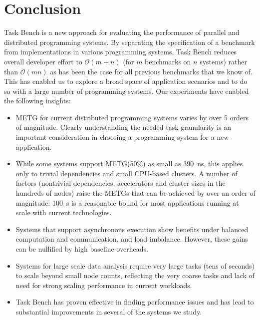 \section{Conclusion}
\label{sec:conclusion}

Task Bench is a new approach for evaluating the performance of
parallel and distributed programming systems. By separating the
specification of a benchmark from implementations in various
programming systems, Task Bench reduces overall developer effort to
$\mathcal{O}(m + n)$ (for $m$ benchmarks on $n$ systems) rather than
$\mathcal{O}(mn)$ as has been the case for all previous
benchmarks that we know of. This has enabled us to explore a broad space of
application scenarios and to do so with a large number of programming
systems. Our experiments have enabled the following
insights:

\begin{itemize}[leftmargin=*]

\item METG for current distributed programming systems varies by over
  5 orders of magnitude.  Clearly understanding the needed task
  granularity is an important consideration in choosing a programming
  system for a new application.

\item While some systems support METG(50\%) as small as 390~ns, this applies only to trivial dependencies and small CPU-based clusters. A number of factors (nontrivial dependencies, accelerators and cluster sizes in the hundreds of nodes) raise
  the METGs that can be achieved by over an order of magnitude: 100~\textmu{}s is a reasonable bound for most applications running at scale with current technologies.

\item Systems that support asynchronous execution show benefits under
  balanced computation
  and communication, and load imbalance. However, these gains can be nullified by
  high baseline overheads.

\item Systems for large scale data analysis require very large tasks
  (tens of seconds) to scale beyond small node counts,
  reflecting the very coarse tasks and lack of need for strong scaling
  performance in current workloads.

\item Task Bench has proven effective in finding performance issues
  and has lead to substantial improvements in several of the systems
  we study.

\end{itemize}

